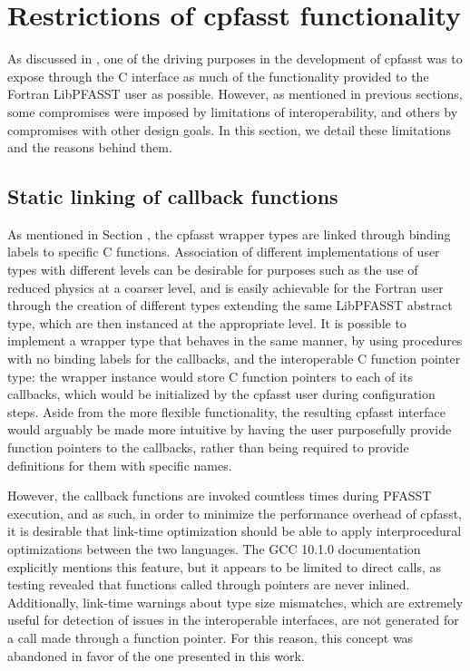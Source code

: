 \section{Restrictions of cpfasst functionality} \label{sec:impl_restrictions}

As discussed in , one of the driving purposes in the development of cpfasst was to expose through the C interface as much of the functionality provided to the Fortran LibPFASST user as possible. However, as mentioned in previous sections, some compromises were imposed by limitations of interoperability, and others by compromises with other design goals. In this section, we detail these limitations and the reasons behind them.

\subsection*{Static linking of callback functions}

As mentioned in Section , the cpfasst wrapper types are linked through binding labels to specific C functions. Association of different implementations of user types with different levels can be desirable for purposes such as the use of reduced physics at a coarser level, and is easily achievable for the Fortran user through the creation of different types extending the same LibPFASST abstract type, which are then instanced at the appropriate level. It is possible to implement a wrapper type that behaves in the same manner, by using  procedures with no binding labels for the callbacks, and the interoperable C function pointer type: the wrapper instance would store C function pointers to each of its callbacks, which would be initialized by the cpfasst user during configuration steps. Aside from the more flexible functionality, the resulting cpfasst interface would arguably be made more intuitive by having the user purposefully provide function pointers to the callbacks, rather than being required to provide definitions for them with specific names.

However, the callback functions are invoked countless times during PFASST execution, and as such, in order to minimize the performance overhead of cpfasst, it is desirable that link-time optimization should be able to apply interprocedural optimizations between the two languages. The GCC 10.1.0 documentation explicitly mentions this feature, but it appears to be limited to direct calls, as testing revealed that functions called through pointers are never inlined. Additionally, link-time warnings about type size mismatches, which are extremely useful for detection of issues in the interoperable interfaces, are not generated for a call made through a function pointer. For this reason, this concept was abandoned in favor of the one presented in this work.

